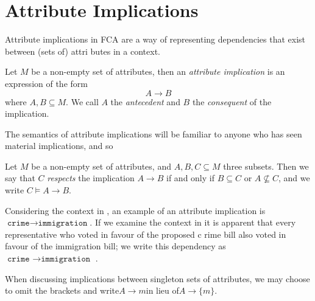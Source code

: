 \section{Attribute Implications}
\label{section:attribute-implications}Attribute implications in FCA are a way of representing dependencies that exist between (sets of) attri
butes in a context.
\begin{definition}
  \label{definition:attribute-implication} Let $M$ be a non-empty set of attributes, then an \emph{attribute implication} is an expression of
  the form
  \[
    A \rightarrow B
  \]
  where $A,B \subseteq M$. We call $A$ the \emph{antecedent} and $B$ the \emph{consequent} of the implication.
\end{definition}
The semantics of attribute implications will be familiar to anyone who has seen material implications, and so
\begin{definition}
  \label{definition:attribute-implication-semantics} Let $M$ be a non-empty set of attributes, and $A,B,C \subseteq M$ three subsets. Then we
  say that $C$ \emph{respects} the implication $A \rightarrow B$ if and only if $B \subseteq C$ or $A \not \subseteq C$, and we write $C \vDash
  A \rightarrow B$.
\end{definition}
Considering the context in , an example of an attribute implication is$\texttt{crime}\rightarrow \texttt{immigration
}$. If we examine the context in it is apparent that every representative who voted in favour of the proposed c rime
bill also voted in favour of the immigration bill; we write this dependency as$\texttt{crime }\rightarrow \texttt{immigration }$.

When discussing implications between singleton sets of attributes, we may choose to omit the brackets and write$A \rightarrow m$in lieu of$A
\rightarrow \{m\}$.


